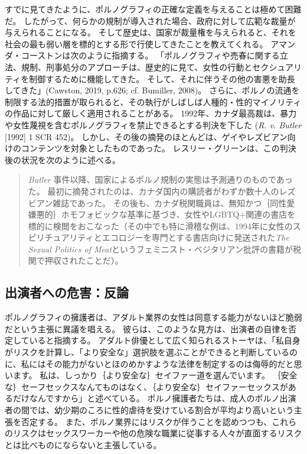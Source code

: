 \documentclass[paper=a4,book,openany]{jlreq}
\newcommand{\ig}[1]{}           %
\begin{document}
すでに見てきたように、ポルノグラフィの正確な定義を与えることは極めて困難だ。
したがって、何らかの規制が導入された場合、政府に対して広範な裁量が与えられることになる。
そして歴史は、国家が裁量権を与えられると、それを社会の最も弱い層を標的とする形で行使してきたことを教えてくれる。
アマンダ・コーストンは次のように指摘する。
「ポルノグラフィや売春に関する立法、規制、刑事処分のアプローチは、歴史的に見て、女性の行動とセクシュアリティを制御するために機能してきた。
そして、それに伴うその他の害悪を助長してきた」(Cawston, 2019, p.626; cf. Bumiller, 2008)。
\nocite{cawston19:_femin_case_pornog}\nocite{bumiller08:_in_abusiv_state}
さらに、ポルノの流通を制限する法的措置が取られると、その執行がしばしば人種的・性的マイノリティの作品に対して厳しく適用されることがある。
1992年、カナダ最高裁は、暴力や女性蔑視を含むポルノグラフィを禁止できるとする判決を下した
(\emph{R. v. Butler} [1992] 1 SCR 452)。
しかし、その後の摘発のほとんどは、ゲイやレズビアン向けのコンテンツを対象としたものであった\citep{mackinnon94:_statem_cathar}。
レスリー・グリーン\ig{Leslie Green}は、この判決後の状況を次のように述べる。

\begin{quote}
\emph{Butler} 事件以降、国家によるポルノ規制の実態は予測通りのものであった。
最初に摘発されたのは、カナダ国内の購読者がわずか数十人のレズビアン雑誌であった。
その後も、カナダ税関職員は、無知かつ｛同性愛嫌悪的｝{ホモフォビック}な基準に基づき、女性やLGBTQ+関連の書店を標的に検閲をおこなった（その中でも特に滑稽な例は、1994年に女性のスピリチュアリティとエコロジーを専門とする書店向けに発送された\emph{The Sexual Politics of Meat}というフェミニスト・ベジタリアン批評の書籍が税関で押収されたことだ）。
\citep{green00:pornographies}
\end{quote}

\subsection{出演者への危害：反論}

ポルノグラフィの擁護者は、アダルト業界の女性は同意する能力がないほど脆弱だという主張に異議を唱える。
彼らは、このような見方は、出演者の自律を否定していると指摘する。
アダルト俳優として広く知られるストーヤは、「私自身がリスクを計算し、「より安全な」選択肢を選ぶことができると判断しているのに、私にはその能力がないとほのめかすような法律を制定するのは侮辱的だと思います。
私は、しっかり｛より安全な｝{セイファー}道を選んでいます。
｛安全な｝{セーフ}セックスなんてものはなく、｛より安全な｝{セイファー}セックスがあるだけなんですから」と述べている\citep{kernes12:_no_gover_waste_commit_holds_press_confer}。
ポルノ擁護者たちは、成人のポルノ出演者の間では、幼少期のころに性的虐待を受けている割合が平均より高いという主張を否定する\citep[p.621]{griffith13:_pornog_actres}。
また、ポルノ業界にはリスクが伴うことを認めつつも、これらのリスクはセックスワーカーや他の危険な職業に従事する人々が直面するリスクとは比べものにならないと主張している。
\end{document}
